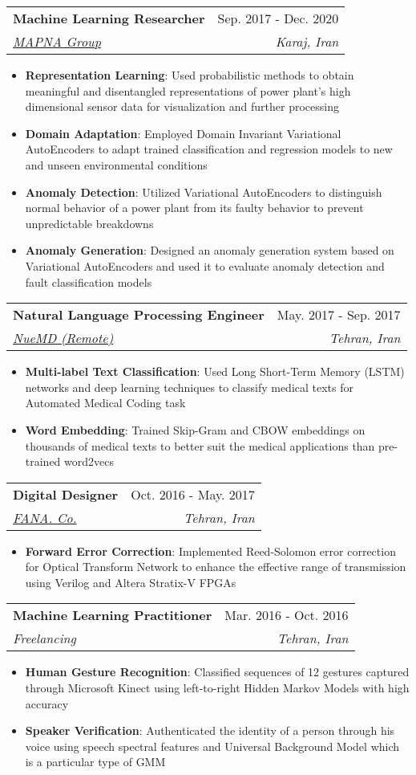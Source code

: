 \documentclass[letterpaper,11pt]{article}
\makeatletter
\newcommand{\resumeItem}[2]{
  \item\small{
    \textbf{#1}{: #2 \vspace{-2pt}}
  }
}
\newcommand{\resumeSubheading}[4]{
  \vspace{-1pt}\item
    \begin{tabular*}{0.97\textwidth}[t]{l@{\extracolsep{\fill}}r}
      \textbf{#1} & #2 \\
      \textit{\small#3} & \textit{\small #4} \\
    \end{tabular*}\vspace{-5pt}
}
\newcommand{\resumeItemListStart}{\begin{itemize}}
\newcommand{\resumeItemListEnd}{\end{itemize}\vspace{-5pt}}
\makeatother
\begin{document}
    \resumeSubheading
      {Machine Learning Researcher}{Sep. 2017 - Dec. 2020}
      {\href{https://www.mapnagroup.com/en}{MAPNA Group}}{Karaj, Iran}
      \resumeItemListStart
        \resumeItem{Representation Learning}
          {Used probabilistic methods to obtain meaningful and disentangled representations of power plant's high dimensional sensor data for visualization and further processing}
        \resumeItem{Domain Adaptation}
          {Employed Domain Invariant Variational AutoEncoders to adapt trained classification and regression models to new and unseen environmental conditions}
        \resumeItem{Anomaly Detection}
          {Utilized Variational AutoEncoders to distinguish normal behavior of a power plant from its faulty behavior to prevent unpredictable breakdowns}
        \resumeItem{Anomaly Generation}
          {Designed an anomaly generation system based on Variational AutoEncoders and used it to evaluate anomaly detection and fault classification models}                    
      \resumeItemListEnd

    \resumeSubheading
      {Natural Language Processing Engineer}{May. 2017 - Sep. 2017}
      {\href{https://nuemd.com/}{NueMD (Remote)}}{Tehran, Iran}
      \resumeItemListStart
        \resumeItem{Multi-label Text Classification}
          {Used Long Short-Term Memory (LSTM) networks and deep learning techniques to classify medical texts for Automated Medical Coding task}
        \resumeItem{Word Embedding}
          {Trained Skip-Gram and CBOW embeddings on thousands of medical texts to better suit the medical applications than pre-trained word2vecs}
      \resumeItemListEnd

    \resumeSubheading
      {Digital Designer}{Oct. 2016 - May. 2017}
      {\href{http://www.fananet.com/indexEn.html}{FANA. Co.}}{Tehran, Iran}
      \resumeItemListStart
        \resumeItem{Forward Error Correction}
          {Implemented Reed-Solomon error correction for Optical Transform Network to enhance the effective range of transmission using Verilog and Altera Stratix-V FPGAs}
      \resumeItemListEnd

    \resumeSubheading
      {Machine Learning Practitioner}{Mar. 2016 - Oct. 2016}
      {Freelancing}{Tehran, Iran}
      \resumeItemListStart
        \resumeItem{Human Gesture Recognition}
          {Classified sequences of 12 gestures captured through Microsoft Kinect using left-to-right Hidden Markov Models with high accuracy}
        \resumeItem{Speaker Verification}
          {Authenticated the identity of a person through his voice using speech spectral features and Universal Background Model which is a particular type of GMM}
      \resumeItemListEnd
\end{document}
